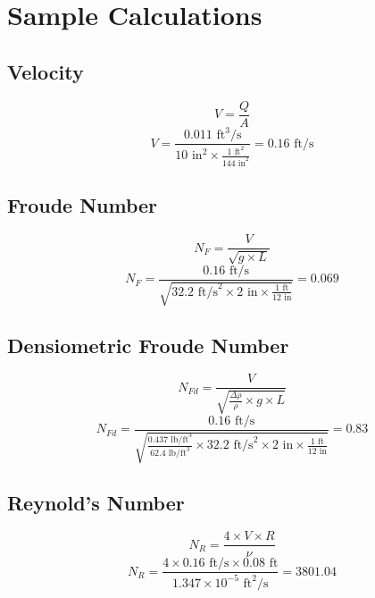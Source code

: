 \documentclass{article}
\begin{document}
\newpage
\section{Sample Calculations}
\subsection{Velocity}
\[V=\frac{Q}{A}\]
\[V=\frac{0.011\text{ ft}^3\text{/s}}{10\text{ in}^2\times \frac{1\text{ ft}^2}{144\text{ in}^2}}=\boxed{0.16\text{ ft/s}}\]
\subsection{Froude Number}
\[N_F=\frac{V}{\sqrt{g\times L}}\]
\[N_F=\frac{0.16 \text{ ft/s}}{\sqrt{32.2\text{ ft/s}^2\times 2\text{ in}\times \frac{1\text{ ft}}{12\text{ in}}}}=\boxed{0.069}\]
\subsection{Densiometric Froude Number}
\[N_{Fd}=\frac{V}{\sqrt{\frac{\Delta\rho}{\rho}\times g\times L}}\]
\[N_{Fd}=\frac{0.16 \text{ ft/s}}{\sqrt{\frac{0.437\text{ lb/ft}^3}{62.4\text{ lb/ft}^3}\times 32.2\text{ ft/s}^2\times 2\text{ in}\times \frac{1\text{ ft}}{12\text{ in}}}}=\boxed{0.83}\]
\subsection{Reynold's Number}
\[N_R=\frac{4\times V\times R}{\nu}\]
\[N_R=\frac{4\times 0.16 \text{ ft/s}\times 0.08\text{ ft}}{1.347\times 10^{-5} \text{ ft}^2\text{/s}}=\boxed{3801.04}\]
\newpage
\end{document}
